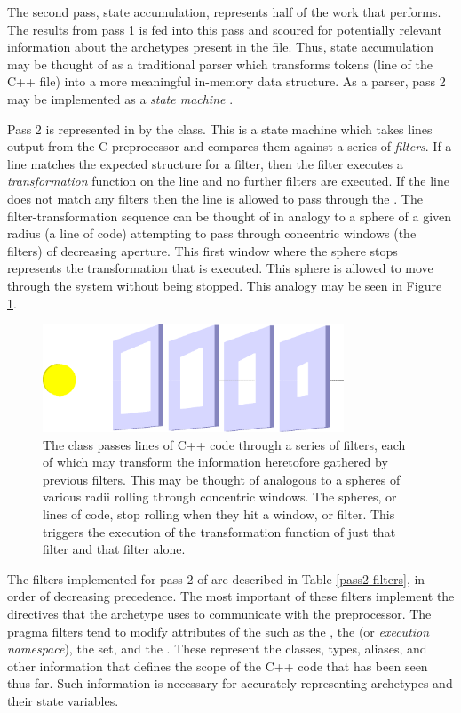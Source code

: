The second pass, state accumulation, represents half of the work that \cycpp performs.
The results from pass 1 is fed into this pass and scoured for 
potentially relevant information about the archetypes present in the file. 
Thus, state accumulation 
may be thought of as a traditional parser which transforms tokens (line of the 
C++ file) into a more meaningful in-memory data structure. As a parser, pass 2 
may be implemented as a \emph{state machine} \cite{mertz2003text,wagner2006modeling}.

Pass 2 is represented in \cycpp by the  class.  This is a
state machine which takes lines output from the C preprocessor and compares them 
against a series of \emph{filters}.  If a line matches the expected structure 
for a filter, then the filter executes a \emph{transformation} function on the 
line and no further filters are executed. If the line does not match any filters
then the line is allowed to pass through the . 
The filter-transformation sequence can be thought of in analogy to a sphere of a 
given radius (a line of code) attempting to pass through concentric windows 
(the filters) of decreasing aperture. This first window where the sphere stops 
represents the transformation that is executed.  This sphere is allowed to 
move through the system without being stopped. This analogy may be seen in 
Figure \ref{filter-analogy}.  

\begin{figure}[htbc]
\label{filter-analogy}
\centering
\includegraphics[width=0.8\textwidth]{filter-analogy.eps}
\caption{The  class passes lines of C++ code through 
a series of filters, each of which may transform the information heretofore gathered
by previous filters. 
This may be thought of analogous to a spheres of various radii rolling through 
concentric windows.  The spheres, or lines of code, stop rolling when they hit a  
window, or filter. This triggers the execution of the transformation function of just 
that filter and that filter alone.}
\end{figure}

The filters implemented for pass 2 of \cycpp are described in Table \ref{pass2-filters}, 
in order of decreasing precedence. The most important of these filters implement 
the  directives that the archetype uses to communicate
with the preprocessor.  The pragma filters tend to modify attributes of
the  such as the , the  
(or \emph{execution namespace}), the  set, and the . 
These represent the classes, types, aliases, and other information that defines
the scope of the C++ code that has been seen thus far. Such information is necessary 
for accurately representing archetypes and their state variables. 

